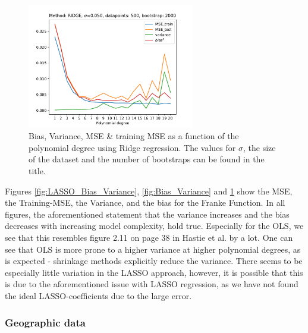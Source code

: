 \documentclass[11pt,a4paper,titlepage]{article}
\begin{document}
\begin{figure}[H]
\centering
\includegraphics[width=0.65\textwidth]{Bias_Variance_RIDGE.pdf}
\caption[Bias, Variance, MSE \& training MSE as a function of the polynomial degree using Ridge regression]{Bias, Variance, MSE \& training MSE as a function of the polynomial degree using Ridge regression. The values for $\sigma$, the size of the dataset and the number of bootstraps can be found in the title.}
\label{fig:Ridge_Bias_Variance}
\end{figure}
Figures \ref{fig:LASSO_Bias_Variance}, \ref{fig:Bias_Variance} and \ref{fig:Ridge_Bias_Variance} show the MSE, the Training-MSE, the Variance, and the bias for the Franke Function. In all figures, the aforementioned statement that the variance increases and the bias decreases with increasing model complexity, hold true. Especially for the OLS, we see that this resembles  figure 2.11 on page 38 in Hastie et al. by a lot\citep{hastie01statisticallearning}. One can see that OLS is more prone to a higher variance at higher polynomial degrees, as is expected - shrinkage methods explicitly reduce the variance. There seems to be especially little variation in the LASSO approach, however, it is possible that this is due to the aforementioned issue with LASSO regression, as we have not found the ideal LASSO-coefficients due to the large error.

\subsubsection{Geographic data}
\end{document}
